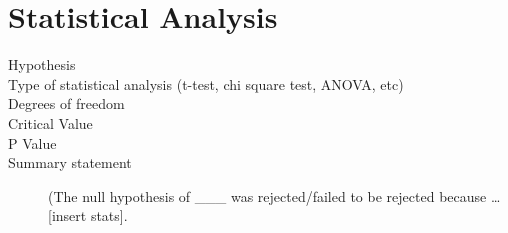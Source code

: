 \part{Statistical Analysis}

\begin{description}
    \item[Hypothesis]
    \item[Type of statistical analysis (t-test, chi square test, ANOVA, etc)]
    \item[Degrees of freedom]
    \item[Critical Value]
    \item[P Value]
    \item[Summary statement] (The null hypothesis of \_\_\_ {was rejected/failed to be rejected} because \ldots [insert stats].
\end{description}

